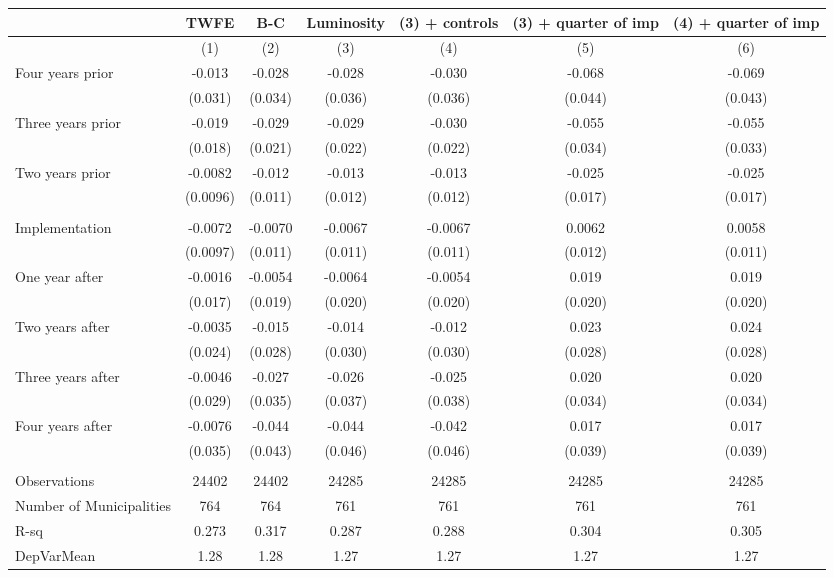 \begin{tabular}{lcccccc}
\toprule
      & TWFE  & B-C   & Luminosity & (3) + controls & (3) + quarter of imp & (4) + quarter of imp \\
\midrule
      & (1)   & (2)   & (3)   & (4)   & (5)   & (6) \\
\midrule
\midrule
Four years prior & -0.013 & -0.028 & -0.028 & -0.030 & -0.068 & -0.069 \\
      & (0.031) & (0.034) & (0.036) & (0.036) & (0.044) & (0.043) \\
Three years prior & -0.019 & -0.029 & -0.029 & -0.030 & -0.055 & -0.055 \\
      & (0.018) & (0.021) & (0.022) & (0.022) & (0.034) & (0.033) \\
Two years prior & -0.0082 & -0.012 & -0.013 & -0.013 & -0.025 & -0.025 \\
      & (0.0096) & (0.011) & (0.012) & (0.012) & (0.017) & (0.017) \\
      &       &       &       &       &       &  \\
Implementation & -0.0072 & -0.0070 & -0.0067 & -0.0067 & 0.0062 & 0.0058 \\
      & (0.0097) & (0.011) & (0.011) & (0.011) & (0.012) & (0.011) \\
One year after & -0.0016 & -0.0054 & -0.0064 & -0.0054 & 0.019 & 0.019 \\
      & (0.017) & (0.019) & (0.020) & (0.020) & (0.020) & (0.020) \\
Two years after & -0.0035 & -0.015 & -0.014 & -0.012 & 0.023 & 0.024 \\
      & (0.024) & (0.028) & (0.030) & (0.030) & (0.028) & (0.028) \\
Three years after & -0.0046 & -0.027 & -0.026 & -0.025 & 0.020 & 0.020 \\
      & (0.029) & (0.035) & (0.037) & (0.038) & (0.034) & (0.034) \\
Four years after & -0.0076 & -0.044 & -0.044 & -0.042 & 0.017 & 0.017 \\
      & (0.035) & (0.043) & (0.046) & (0.046) & (0.039) & (0.039) \\
      &       &       &       &       &       &  \\
\midrule
Observations & 24402 & 24402 & 24285 & 24285 & 24285 & 24285 \\
Number of Municipalities & 764   & 764   & 761   & 761   & 761   & 761 \\
R-sq  & 0.273 & 0.317 & 0.287 & 0.288 & 0.304 & 0.305 \\
DepVarMean & 1.28  & 1.28  & 1.27  & 1.27  & 1.27  & 1.27 \\
\bottomrule
\bottomrule
\end{tabular}%
